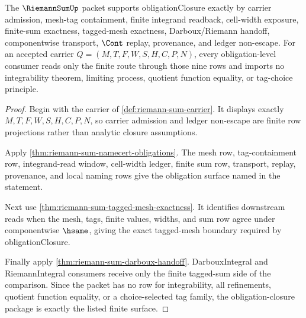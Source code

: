 \begin{theorem}
\label{thm:riemann-sum-obligation-closure-package}
The $\RiemannSumUp$ packet supports obligationClosure exactly by carrier admission, mesh-tag containment, finite integrand readback, cell-width exposure, finite-sum exactness, tagged-mesh exactness, Darboux/Riemann handoff, componentwise transport, $\Cont$ replay, provenance, and ledger non-escape. For an accepted carrier $Q=(M,T,F,W,S,H,C,P,N)$, every obligation-level consumer reads only the finite route through those nine rows and imports no integrability theorem, limiting process, quotient function equality, or tag-choice principle.
\end{theorem}
\begin{proof}
Begin with the carrier of \autoref{def:riemann-sum-carrier}. It displays exactly $M,T,F,W,S,H,C,P,N$, so carrier admission and ledger non-escape are finite row projections rather than analytic closure assumptions.

Apply \autoref{thm:riemann-sum-namecert-obligations}. The mesh row, tag-containment row, integrand-read window, cell-width ledger, finite sum row, transport, replay, provenance, and local naming rows give the obligation surface named in the statement.

Next use \autoref{thm:riemann-sum-tagged-mesh-exactness}. It identifies downstream reads when the mesh, tags, finite values, widths, and sum row agree under componentwise $\hsame$, giving the exact tagged-mesh boundary required by obligationClosure.

Finally apply \autoref{thm:riemann-sum-darboux-handoff}. DarbouxIntegral and RiemannIntegral consumers receive only the finite tagged-sum side of the comparison. Since the packet has no row for integrability, all refinements, quotient function equality, or a choice-selected tag family, the obligation-closure package is exactly the listed finite surface.
\end{proof}

